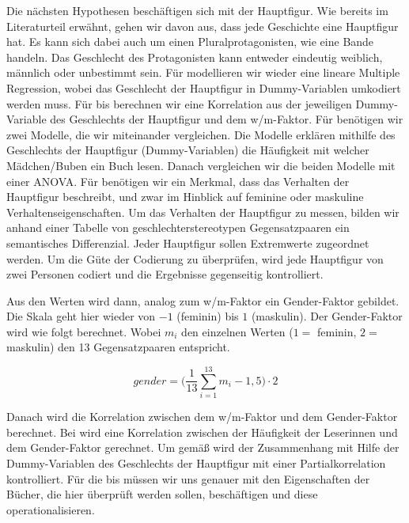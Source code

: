 Die nächsten Hypothesen beschäftigen sich mit der Hauptfigur. Wie
bereits im Literaturteil erwähnt, gehen wir davon aus, dass jede
Geschichte eine Hauptfigur hat. Es kann sich dabei auch um einen
Pluralprotagonisten, wie \zB eine Bande handeln. Das Geschlecht des
Protagonisten kann entweder eindeutig weiblich, männlich oder unbestimmt
sein. Für  modellieren wir wieder eine lineare Multiple
Regression, wobei das Geschlecht der Hauptfigur in Dummy-Variablen
umkodiert werden muss. Für  bis  berechnen wir
eine Korrelation aus der jeweiligen Dummy-Variable des Geschlechts der
Hauptfigur und dem w/m-Faktor. Für  benötigen wir zwei
Modelle, die wir miteinander vergleichen. Die Modelle erklären mithilfe
des Geschlechts der Hauptfigur (Dummy-Variablen) die Häufigkeit mit
welcher Mädchen/Buben ein Buch lesen. Danach vergleichen wir die beiden
Modelle mit einer ANOVA. Für  benötigen wir ein Merkmal, dass
das Verhalten der Hauptfigur beschreibt, und zwar im Hinblick auf
feminine oder maskuline Verhaltenseigenschaften. Um das Verhalten der
Hauptfigur zu messen, bilden wir anhand einer Tabelle von
geschlechterstereotypen Gegensatzpaaren ein semantisches Differenzial.
\parencites[174\psq]{feldmann2006}[93\psqq]{Spillner1974} Jeder
Hauptfigur sollen Extremwerte zugeordnet werden. Um die Güte der
Codierung zu überprüfen, wird jede Hauptfigur von zwei Personen codiert
und die Ergebnisse gegenseitig kontrolliert.



Aus den Werten wird dann, analog zum w/m-Faktor ein Gender-Faktor
gebildet. Die Skala geht hier wieder von $-1$ (feminin) bis $1$
(maskulin). Der Gender-Faktor wird wie folgt berechnet. Wobei $m_i$ den
einzelnen Werten ($1=$ feminin, $2=$ maskulin) den 13 Gegensatzpaaren
entspricht.

\begin{equation} gender=\Bigg(\frac{1}{13}\sum_{i=1}^{13}m_i-1{,}5\Bigg)\cdot 2 \end{equation}

Danach wird die Korrelation zwischen dem w/m-Faktor und dem
Gender-Faktor berechnet. Bei  wird eine Korrelation zwischen
der Häufigkeit der Leserinnen und dem Gender-Faktor gerechnet. Um gemäß
 wird der Zusammenhang mit Hilfe der Dummy-Variablen des
Geschlechts der Hauptfigur mit einer Partialkorrelation kontrolliert.
Für die  bis  müssen wir uns genauer mit den
Eigenschaften der Bücher, die hier überprüft werden sollen, beschäftigen
und diese operationalisieren.

